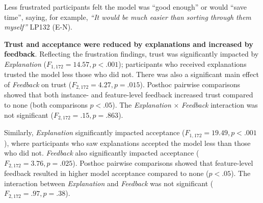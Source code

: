 Less frustrated participants felt the model was ``good enough'' or would ``save time'', saying, for example, %
\textit{``It would be much easier than sorting through them myself''} LP132 (E-N).

\textbf{Trust and acceptance were reduced by explanations and increased by feedback}.
%
Reflecting the frustration findings, trust was significantly impacted by \textit{Explanation} ($F_{1, 172}=14.57, p < .001$); participants who received explanations trusted the model less those who did not. There was also a significant main effect of \textit{Feedback} on trust ($F_{2, 172}=4.27, p = .015$). Posthoc pairwise comparisons showed that both instance- and feature-level feedback increased trust compared to none (both comparisons $p<.05$). The \textit{Explanation} $\times$ \textit{Feedback} interaction was not significant ($F_{2, 172}=.15, p=.863$).

Similarly, \textit{Explanation} significantly impacted acceptance ($F_{1, 172}=19.49, p < .001$), where participants who saw explanations accepted the model less than those who did not. 
\textit{Feedback} also significantly impacted acceptance ($F_{2, 172}=3.76, p=.025$). Posthoc pairwise comparisons showed that feature-level feedback resulted in higher model acceptance compared to none ($p<.05$). The interaction between \textit{Explanation} and \textit{Feedback} was not significant ($F_{2, 172}=.97, p=.38$).


